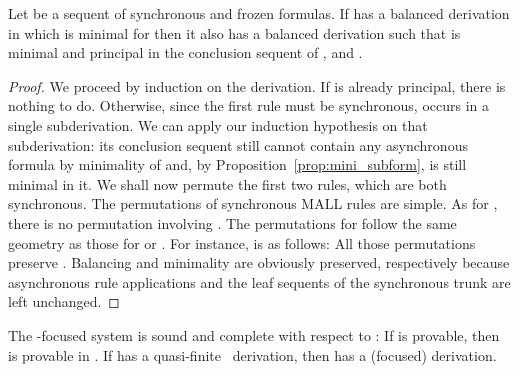 \begin{lemma} \label{lem:sync}
Let  be a sequent of synchronous and frozen formulas.
If 
has a balanced derivation  in which  is minimal for 
then it also has a balanced derivation  such that
 is minimal and principal in the conclusion sequent of ,
and .
\end{lemma}

\begin{proof}
We proceed by induction on the derivation.
If  is already principal, there is nothing to do.
Otherwise, since the first rule must be synchronous,
 occurs in a single subderivation.
We can apply our induction hypothesis on that subderivation:
its conclusion sequent still cannot contain any asynchronous formula by
minimality of  and,
by Proposition~\ref{prop:mini_subform},  is still minimal in it.
We shall now permute the first two rules, which are both synchronous.
The permutations of synchronous MALL rules are simple.
As for , there is no permutation involving .
The permutations for  follow the same geometry as those for 
or . For instance,  is as follows:
All those permutations preserve .
Balancing and minimality are obviously preserved, respectively
because asynchronous rule applications and
the leaf sequents of the synchronous trunk are left unchanged.
\end{proof}

\begin{theorem}
The -focused system is sound and complete with respect to \mumall:
If  is provable, then 
  is provable in \mumall.
If  has a quasi-finite \mumall\ derivation,
  then  has a (focused) derivation.
\end{theorem}


